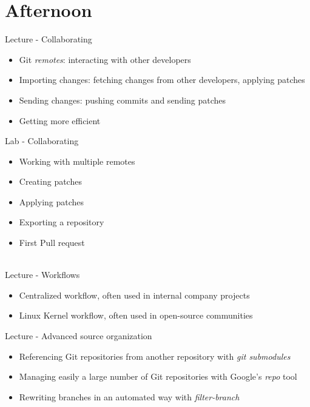 \documentclass[a4paper,12pt,obeyspaces,spaces,hyphens]{article}
\begin{document}
\section{Afternoon}

\feagendatwocolumn
{Lecture - Collaborating}
{
  \begin{itemize}
  \item Git {\em remotes}: interacting with other developers
  \item Importing changes: fetching changes from other developers, applying patches
  \item Sending changes: pushing commits and sending patches
  \item Getting more efficient
  \end{itemize}
}
{Lab - Collaborating}
{
  \begin{itemize}
  \item Working with multiple remotes
  \item Creating patches
  \item Applying patches
  \item Exporting a repository
  \item First Pull request
  \end{itemize}
}
\\
\feagendatwocolumn
{Lecture - Workflows}
{
  \begin{itemize}
  \item Centralized workflow, often used in internal company projects
  \item Linux Kernel workflow, often used in open-source communities
  \end{itemize}
}
{Lecture - Advanced source organization}
{
  \begin{itemize}
  \item Referencing Git repositories from another repository with {\em git submodules}
  \item Managing easily a large number of Git repositories with Google's {\em repo} tool
  \item Rewriting branches in an automated way with {\em filter-branch}
  \end{itemize}
}
\end{document}
